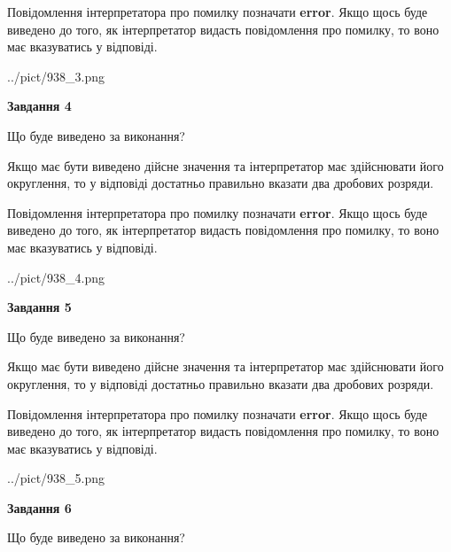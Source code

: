 \documentclass[12pt, ukrainian]{article}
\begin{document}
{\begin {Large}
Повідомлення інтерпретатора про помилку позначати \textbf{error}.
Якщо щось буде виведено до того, як інтерпретатор видасть повідомлення про помилку, 
то воно має вказуватись у відповіді. \par

\begin{center}
	{../pict/938_3.png}
\end{center}
\newpage

{\begin {center}\textbf{Завдання 4}\end {center}}\par
Що буде виведено за виконання? \par

Якщо має бути виведено дійсне значення та інтерпретатор має здійснювати його округлення, 
то у відповіді достатньо правильно вказати два дробових розряди.

Повідомлення інтерпретатора про помилку позначати \textbf{error}.
Якщо щось буде виведено до того, як інтерпретатор видасть повідомлення про помилку, 
то воно має вказуватись у відповіді. \par

\begin{center}
	{../pict/938_4.png}
\end{center}
\newpage

{\begin {center}\textbf{Завдання 5}\end {center}}\par
Що буде виведено за виконання? \par

Якщо має бути виведено дійсне значення та інтерпретатор має здійснювати його округлення, 
то у відповіді достатньо правильно вказати два дробових розряди.

Повідомлення інтерпретатора про помилку позначати \textbf{error}.
Якщо щось буде виведено до того, як інтерпретатор видасть повідомлення про помилку, 
то воно має вказуватись у відповіді. \par

\begin{center}
	{../pict/938_5.png}
\end{center}
\newpage

{\begin {center}\textbf{Завдання 6}\end {center}}\par
Що буде виведено за виконання? \par


\end{Large}}
\end{document}
